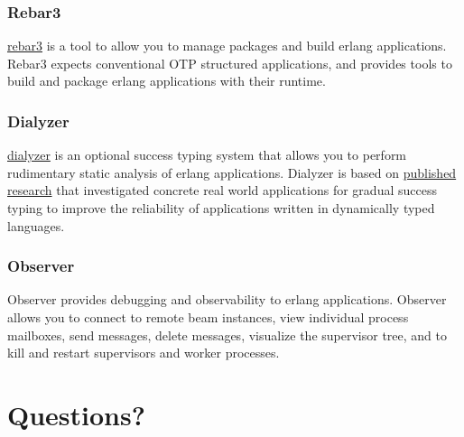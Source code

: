 \documentclass{beamer}
\begin{document}
\begin{frame}
  \frametitle{Rebar3}
  \href{https://github.com/erlang/rebar3}{rebar3} is a tool to allow
  you to manage packages and build erlang applications.  Rebar3
  expects conventional OTP structured applications, and provides tools
  to build and package erlang applications with their runtime.
\end{frame}

\begin{frame}
  \frametitle{Dialyzer}
  \href{http://erlang.org/doc/man/dialyzer.html}{dialyzer} is an
  optional success typing system that allows you to perform
  rudimentary static analysis of erlang applications.  Dialyzer is
  based on
  \href{http://user.it.uu.se/~kostis/Papers/war_story.pdf}{published
    research} that investigated concrete real world applications for
  gradual success typing to improve the reliability of applications
  written in dynamically typed languages.
\end{frame}

\begin{frame}
  \frametitle{Observer}
  Observer provides debugging and observability to erlang
  applications.  Observer allows you to connect to remote beam
  instances, view individual process mailboxes, send messages, delete
  messages, visualize the supervisor tree, and to kill and restart
  supervisors and worker processes.
\end{frame}

\section{Questions?}
\end{document}
